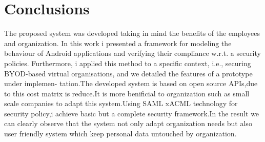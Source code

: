\graphicspath{ {images/} }
\chapter{Conclusions}
\hspace{5mm} The proposed system was developed taking in mind the benefits of the employees and organization.
In this work i presented a framework for modeling the behaviour of Android applications and verifying
their compliance w.r.t. a security policies. Furthermore, i applied this method to a specific context, i.e.,
securing BYOD-based virtual organisations, and we detailed the features of a prototype under implemen-
tation.The developed system is based on open source APIs,due to this cost matrix is reduce.It is more benificial to organization such as small scale companies to adapt this system.Using SAML xACML technology for security policy,i achieve basic but a complete security framework.In the result we can clearly observe that the system not only adapt organization needs  but also user friendly system which keep personal data untouched by organization. 
%



